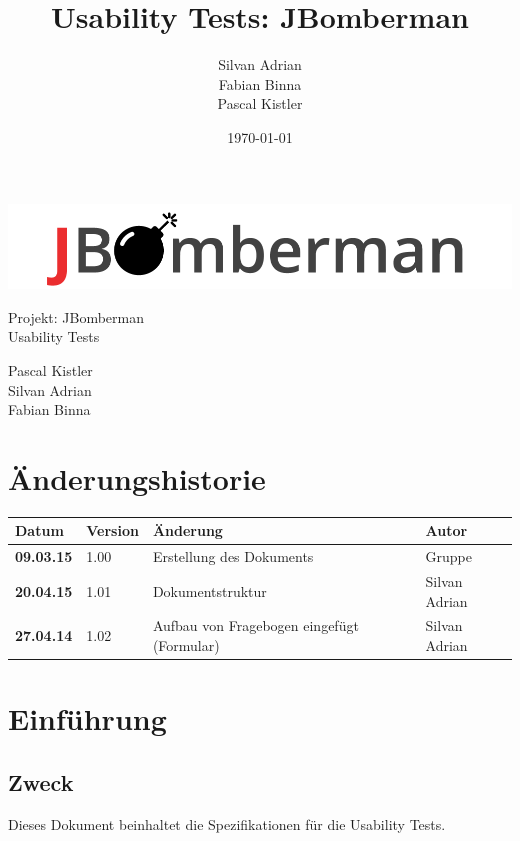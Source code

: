 \documentclass[11pt]{scrartcl}
\title{Usability Tests: JBomberman}
\author{Silvan Adrian \\ Fabian Binna \\ Pascal Kistler}
\date{\today{}}
\begin{document}
\def\arraystretch{1.5}
\begin{titlepage}
\begin{center}
\vspace{10em}
\includegraphics[scale=2]{jbomberman}
\vspace{10em}
\end{center}
\begin{center}
\huge {Projekt: JBomberman} \\
\huge {Usability Tests}
\end{center}
\begin{center}
\vspace{10em}
\LARGE {Pascal Kistler} \\
\LARGE {Silvan Adrian} \\
\LARGE {Fabian Binna}
\end{center}

\end{titlepage}

\newpage
\section{Änderungshistorie}
\label{sec:Änderungen}

\begin{tabularx}{\linewidth}{l l l l}
\textbf{Datum} & \textbf{Version} & \textbf{Änderung}  & \textbf{Autor} \\
\hline
\textbf{09.03.15} & 1.00 & Erstellung des Dokuments & Gruppe \\
\textbf{20.04.15} & 1.01 & Dokumentstruktur & Silvan Adrian \\
\textbf{27.04.14} & 1.02 & Aufbau von Fragebogen eingefügt (Formular) & Silvan 
Adrian \\
\end{tabularx}

\newpage
\tableofcontents
\newpage
\section{Einführung}
\subsection{Zweck}
Dieses Dokument beinhaltet die Spezifikationen für die Usability Tests.
\end{document}
